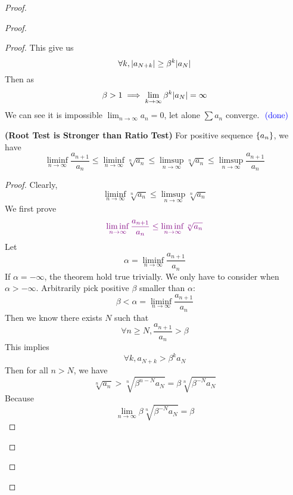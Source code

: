 \documentclass{report}
\begin{document}
\begin{proof}
\begin{proof}
\begin{proof}
This give us
\begin{equation}
\forall k, |a_{N+k}|\geq \beta^k |a_N|
\end{equation}
Then as 
\begin{equation}
\beta >1\implies \lim_{k\to\infty}\beta ^k|a_N|=\infty
\end{equation}
We can see it is impossible $\lim_{n\to\infty}a_n=0$, let alone $\sum a_n$ converge. $\textcolor{blue}{\text{ (done) }}$
\begin{theorem}
\label{4.5.3}
\textbf{(Root Test is Stronger than Ratio Test)} For positive sequence $\{ a_n \}$, we have
\begin{equation}
\liminf_{n\to\infty}\frac{a_{n+1}}{a_n}\leq \liminf_{n\to\infty} \sqrt[n]{a_n} \leq \limsup_{n\to\infty} \sqrt[n]{a_n} \leq \limsup_{n\to\infty} \frac{a_{n+1}}{a_n}
\end{equation}
\end{theorem}
\begin{proof}
Clearly, 
\begin{equation}
\liminf_{n\to\infty} \sqrt[n]{a_n}\leq \limsup_{n\to\infty} \sqrt[n]{a_n}  
\end{equation}
We first prove
\begin{equation}
  \textcolor{violet}{\liminf_{n\to\infty} \frac{a_{n+1}}{a_n}\leq \liminf_{n\to\infty} \sqrt[n]{a_n}}
\end{equation}
Let 
\begin{equation}
\alpha =\liminf_{n\to\infty} \frac{a_{n+1}}{a_n}
\end{equation}
If $\alpha =-\infty$, the theorem hold true trivially. We only have to consider when $\alpha >-\infty$. Arbitrarily pick positive $\beta $ smaller than $\alpha $:
\begin{equation}
\beta <\alpha=\liminf_{n\to\infty} \frac{a_{n+1}}{a_n}
\end{equation}
Then we know there exists $N$ such that
 \begin{equation}
\forall n\geq N, \frac{a_{n+1}}{a_n}>\beta 
\end{equation}
This implies 
\begin{equation}
\forall k, a_{N+k}>\beta^k a_N
\end{equation}
Then for all $n>N$, we have
 \begin{equation}
   \sqrt[n]{a_n}>\sqrt[n]{ \beta^{n-N}a_{N}}=\beta \sqrt[n]{\beta^{-N}a_N} 
\end{equation}
Because 
\begin{equation}
\lim_{n\to\infty}\beta \sqrt[n]{\beta^{-N}a_N}=\beta 
\end{equation}

\end{proof}
\end{proof}
\end{proof}
\end{proof}
\end{document}
